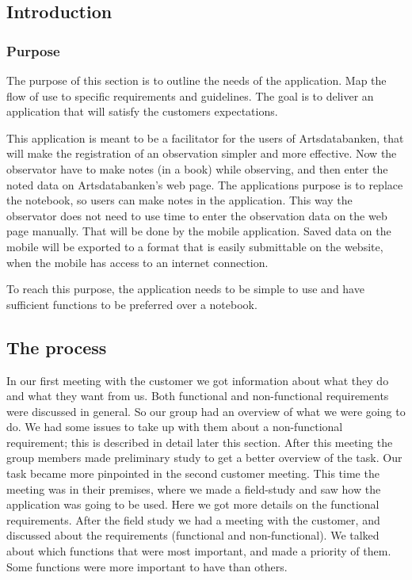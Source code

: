 \subsection{Introduction}
\subsubsection{Purpose}
	The purpose of this section is to outline the needs of the application. Map the flow of use to specific requirements and guidelines. The goal is to deliver an application that will satisfy the customers expectations.  

This application is meant to be a facilitator for the users of Artsdatabanken, that will make the registration of an observation simpler and more effective. Now the observator have to make notes (in a book) while observing, and then enter the noted data on Artsdatabanken's web page. The applications purpose is to replace the notebook, so users can make notes in the application. This way the observator does not need to use time to enter the observation data on the web page manually. That will be done by the mobile application. Saved data on the mobile will be exported to a format that is easily submittable on the website, when the mobile has access to an internet connection.

To reach this purpose, the application needs to be simple to use and have sufficient functions to be preferred over a notebook. 

\subsection{The process}
	In our first meeting with the customer we got information about what they do and what they want from us. Both functional and non-functional requirements were discussed in general. So our group had an overview of what we were going to do. We had some issues to take up with them about a non-functional requirement; this is described in detail later this section. After this meeting the group members made preliminary study to get a better overview of the task.
\indent Our task became more pinpointed in the second customer meeting. This time the meeting was in their premises, where we made a field-study and saw how the application was going to be used. Here we got more details on the functional requirements. After the field study we had a meeting with the customer, and discussed about the requirements (functional and non-functional). We talked about which functions that were most important, and made a priority of them. Some functions were more important to have than others.

